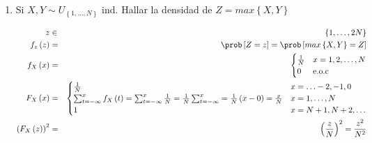 \begin{enumerate}
\begin{enumerate}
\begin{eqnarray*}
X \sim Geo \left( p \right) &\Rightarrow& f_{X}\left(x \right) \begin{cases} pq^{x} & x= 0,1, \ldots\\
0 & \textrm{e.o.c}
\end{cases}\\
Y \sim Geo \left( p \right) &\Rightarrow& f_{Y}\left(y \right) \begin{cases} pq^{y} & y= 0,1, \ldots\\
0 & \textrm{e.o.c}
\end{cases}\\
 f_{XY}\left(x,y \right)&=& \begin{cases} p^{2}q^{x+y} & x= 0,1, \ldots, y=0,1, \ldots\\
0 & \textrm{e.o.c}
\end{cases}\\
f_{W} \left(w \right) &=& \prob \left[W=w \right]= \prob \left[X+Y=w \right]= \prob \left[Y= w-X \right]\\
&=& \sum_{k=0}^{w} \prob \left[Y= w-k \right] \prob \left[X=k \right]\\
&=& \sum_{k=0}^{w} \left( pq^{w-k} \right) \left( pq^{k} \right)= \sum_{k=0}^{w} p^{2} q^{w} = p^{2}q^{w} \sum_{k=0}^{w} \\
&=& \begin{cases}p^{2} q^{w} \left( w \right) & w=0,1,\ldots\\
0 & \textrm{e.o.c}
\end{cases}
\end{eqnarray*}
\item  Si $X,Y \sim U_{ \left\{ 1, \ldots, N \right\} }$ ind. Hallar la densidad de $Z = max \left\{X,Y \right\} $

\begin{eqnarray*}
z &\in& \left\{ 1 , \ldots, 2N \right\} \\
f_{z} \left(z \right) &=& \prob \left[Z = z \right] = \prob \left[max \left\{ X,Y\right\} = Z \right]\\
f_{X} \left(x \right)&=& \begin{cases}
\frac{1}{N} & x=1,2, \ldots ,N\\
0 & \textrm{e.o.c}
\end{cases}\\
F_{X} \left(x \right)&=& \begin{cases}
\frac{1}{N} & x= \ldots -2, -1, 0\\
\sum_{t=- \infty }^{x} f_{X} \left(t \right)= \sum_{t=-\infty}^{x} \frac{1}{N}=\frac{1}{N} \sum_{t=-\infty}^{x} = \frac{1}{N} \left(x-0 \right) = \frac{x}{N} & x= 1, \ldots ,N\\
1 & x= N+1, N+2, \ldots
\end{cases}\\
\left(F_{X} \left(z \right) \right)^{2} &=& \left( \frac{z}{N} \right)^ {2} = \frac{z^2}{N^2}
\end{eqnarray*}


\end{enumerate}
\end{enumerate}
